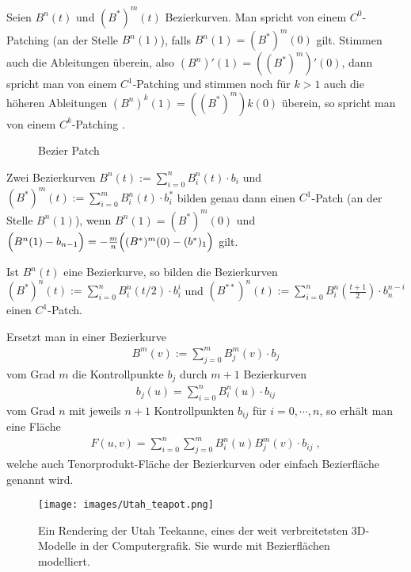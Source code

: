 \begin{Definition}[Patching]
Seien $B^n(t)$ und $(B^*)^m(t)$  Bezierkurven. Man spricht von einem $C^0$-Patching (an der Stelle $B^n(1)$), falls
 $B^n(1) = (B^*)^m(0) $ gilt. Stimmen auch die Ableitungen überein, also  $(B^n)'(1) = ((B^*)^m)'(0) $, dann spricht man von einem $C^1$-Patching und stimmen noch für $k> 1$ auch
die höheren Ableitungen $(B^n)^{k}(1) = ((B^*)^m){k}(0) $ überein, so spricht man von einem $C^k$-Patching . 
 \end{Definition}


\begin{figure}[H]
    \centering
    
    \caption{Bezier Patch}
    \label{fig:bezier-patch}
\end{figure}

\begin{Bemerkung}
Zwei Bezierkurven   $B^n(t) := \sum_{i = 0}^{n} B_i^n(t) \cdot  b_i$ und $(B^*)^m(t) := \sum_{i = 0}^{m} B_i^n(t) \cdot  b^*_i$ bilden genau dann einen $C^1$-Patch  (an der Stelle $B^n(1)$), wenn 
$B^n(1) = (B^*)^m(0)$ und $\Bigl(B^n(1) - b_{n-1} \Bigr)= - \frac{m}{n}  \Bigl((B^*)^m(0) - (b^*)_1 \Bigr)$ gilt.
\end{Bemerkung}


\begin{Definition}
Ist  $B^n(t)$ eine Bezierkurve, so bilden die Bezierkurven $(B^{*})^n(t)  :=  \sum_{i = 0}^{n} B_i^n(t/2) \cdot  b_i^i$ und  $(B^{**})^n(t)  :=  \sum_{i = 0}^{n} B_i^n( \frac{t+1} {2}) \cdot  b_n^{n-i}$
einen $C^1$-Patch.
\end{Definition}


\begin{Definition}
Ersetzt man in einer Bezierkurve 
\begin{align*}
B^m(v) := \sum_{j = 0}^{m} B_j^m(v) \cdot  b_j
\end{align*}
vom Grad $m$ die Kontrollpunkte $b_j$ durch $m+1$ Bezierkurven
\begin{align*}
b_j (u)= \sum_{i = 0}^{n} B_i^n(u) \cdot  b_{ij}
\end{align*}
 vom Grad $n$ mit jeweils $n+1$ Kontrollpunkten $ b_{ij}$ für $i = 0, \cdots , n$, so erhält man eine Fläche
\begin{align*}
F(u,v) =  \sum_{i = 0}^{n}  \sum_{j = 0}^{m} B_i^n(u) B_j^m(v) \cdot  b_{ij} \; ,
\end{align*}
welche auch Tenorprodukt-Fläche der Bezierkurven  oder einfach Bezierfläche genannt wird.
\end{Definition}


\begin{figure}[H]
    \centering
    \texttt{[image: images/Utah\_teapot.png]}
    \caption[Ein Rendering der Utah Teekanne]
            {Ein Rendering der Utah Teekanne, eines der weit verbreitetsten 
             3D-Modelle in der Computergrafik. 
             Sie wurde mit Bezierflächen modelliert.}
    \label{fig:rendering-utah-teapot}
\end{figure}


